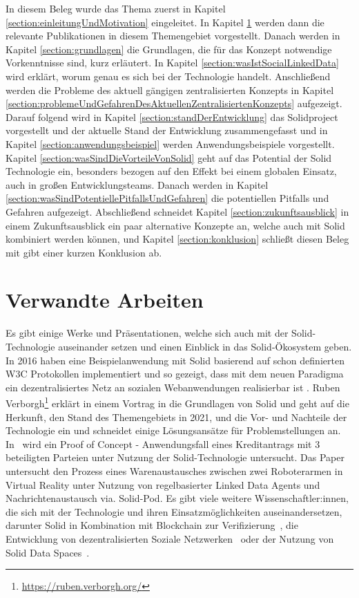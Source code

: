 \documentclass[acmtog]{acmart}
\begin{document}
In diesem Beleg wurde das Thema zuerst in Kapitel \ref{section:einleitungUndMotivation} eingeleitet. In Kapitel \ref{section:relatedWork} werden dann die relevante Publikationen in diesem Themengebiet vorgestellt. Danach werden in Kapitel \ref{section:grundlagen} die Grundlagen, die für das Konzept notwendige Vorkenntnisse sind, kurz erläutert. In Kapitel \ref{section:wasIstSocialLinkedData} wird erklärt, worum genau es sich bei der Technologie handelt. Anschließend werden die Probleme des aktuell gängigen zentralisierten Konzepts in Kapitel \ref{section:problemeUndGefahrenDesAktuellenZentralisiertenKonzepts} aufgezeigt.  Darauf folgend wird in Kapitel \ref{section:standDerEntwicklung} das Solidproject vorgestellt und der aktuelle Stand der Entwicklung zusammengefasst und in Kapitel \ref{section:anwendungsbeispiel} werden Anwendungsbeispiele vorgestellt. Kapitel \ref{section:wasSindDieVorteileVonSolid} geht auf das Potential der Solid Technologie ein, besonders bezogen auf den Effekt bei einem globalen Einsatz, auch in großen Entwicklungsteams. Danach werden in Kapitel \ref{section:wasSindPotentiellePitfallsUndGefahren} die potentiellen Pitfalls und Gefahren aufgezeigt. Abschließend schneidet Kapitel \ref{section:zukunftsausblick} in einem Zukunftsausblick ein paar alternative Konzepte an, welche auch mit Solid kombiniert werden können, und Kapitel \ref{section:konklusion} schließt diesen Beleg mit gibt einer kurzen Konklusion ab.

\section{Verwandte Arbeiten} \label{section:relatedWork}

Es gibt einige Werke und Präsentationen, welche sich auch mit der Solid-Technologie auseinander setzen und einen Einblick in das Solid-Ökosystem geben.
In 2016 haben\cite{sambra2016solid} eine Beispielanwendung mit Solid basierend auf schon definierten W3C Protokollen implementiert und so gezeigt, dass mit dem neuen Paradigma ein dezentralisiertes Netz an sozialen Webanwendungen realisierbar ist .
Ruben Verborgh\footnote{\url{https://ruben.verborgh.org/}} erklärt in einem Vortrag in \cite{MarcoNeumann.2021} die Grundlagen von Solid und geht auf die Herkunft, den Stand des Themengebiets in 2021, und die Vor- und Nachteile der Technologie ein und schneidet einige Lösungsansätze für Problemstellungen an.
In~\cite{DBLP:conf/i-semantics/HenselmannKSS0H22} wird ein Proof of Concept - Anwendungsfall eines Kreditantrags mit 3 beteiligten Parteien unter Nutzung der Solid-Technologie untersucht. Das Paper~\cite{wang2022using} untersucht den Prozess eines Warenaustausches zwischen zwei Roboterarmen in Virtual Reality unter Nutzung von regelbasierter Linked Data Agents und Nachrichtenaustausch via. Solid-Pod.
Es gibt viele weitere Wissenschaftler:innen, die sich mit der Technologie und ihren Einsatzmöglichkeiten auseinandersetzen, darunter Solid in Kombination mit Blockchain zur Verifizierung~\cite{ramachandran2020towards}, die Entwicklung von dezentralisierten Soziale Netzwerken~\cite{yeung2023decentralization} oder der Nutzung von Solid Data Spaces~\cite{meckler2023web}.
\end{document}
